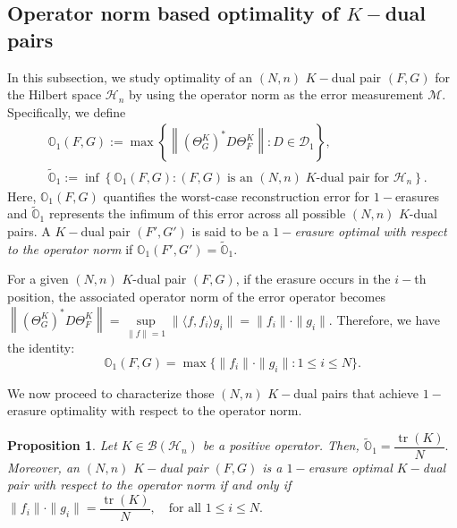 \documentclass[final,1p,times]{elsarticle}
\newtheorem{prop}[thm]{Proposition}
\begin{document}
\subsection{Operator norm based optimality of $K-$dual pairs}

In this subsection, we study optimality of an $(N,n)$ $K-$dual pair $(F, G)$ for the Hilbert space $\mathcal{H}_n$ by using the operator norm as the error measurement \( \mathcal{M} \). Specifically, we define
\begin{align*}
	&\mathbb{O}_{1}(F,G) := \max \left\{ \left\| (\Theta_{G}^K)^* D \Theta_F^K \right\| : D \in \mathcal{D}_1 \right\}, \\&
	\widetilde{\mathbb{O}}_{1} := \inf \left\{ \mathbb{O}_{1}(F,G) : (F,G)\; \text{is an } (N,n)\; K\text{-dual pair for } \mathcal{H}_n \right\}.
\end{align*}
Here, \( \mathbb{O}_{1}(F,G) \) quantifies the worst-case reconstruction error for $1-$erasures and \( \widetilde{\mathbb{O}}_{1} \) represents the infimum of this error across all possible $(N,n)$ $K$-dual pairs. A $K-$dual pair \( (F', G') \) is said to be a \textit{$1-$erasure optimal with respect to the operator norm} if $\mathbb{O}_{1}(F', G') = \widetilde{\mathbb{O}}_{1}.$
\par For a given $(N,n)$ $K$-dual pair $(F, G)$, if the erasure occurs in the $i-$th position, the associated operator norm of the error operator becomes $\left\| (\Theta_{G}^K)^* D \Theta_{F}^K \right\| = \sup\limits_{\|f\|=1} \| \langle f, f_i \rangle g_i \| = \|f_i\| \cdot \|g_i\|.$ Therefore, we have the identity:
\begin{equation}\label{equation4}
	\mathbb{O}_{1}(F, G) = \max \bigg\{ \|f_i\| \cdot \|g_i\| : 1 \leq i \leq N \bigg\}.
\end{equation}

We now proceed to characterize those $(N,n)$ $K-$dual pairs that achieve $1-$erasure optimality with respect to the operator norm.

\begin{prop}\label{thm4point1}
	Let \( K \in \mathcal{B}(\mathcal{H}_n) \) be a positive operator. Then, $\widetilde{\mathbb{O}}_{1} = \dfrac{\operatorname{tr}(K)}{N}.$ Moreover, an $(N,n)$ $K-$dual pair \( (F, G) \) is a $1-$erasure optimal $K-$dual pair with respect to the operator norm if and only if \,$\|f_i\| \cdot \|g_i\| = \dfrac{\operatorname{tr}(K)}{N}, \quad \text{for all } 1 \leq i \leq N.$
\end{prop}
\end{document}
